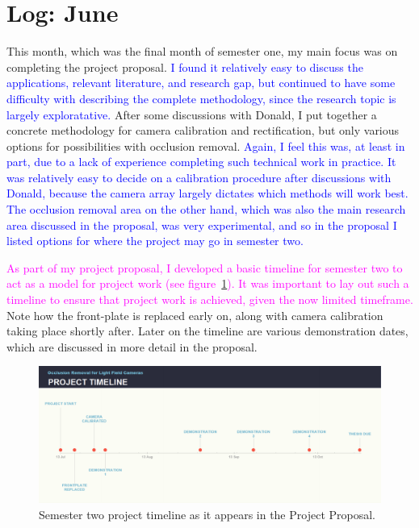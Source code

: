 \documentclass[a4paper, 12pt]{article}
\begin{document}
\section{Log: June}
This month, which was the final month of semester one, my main focus was on completing the project proposal. \textcolor{Blue}{I found it relatively easy to discuss the applications, relevant literature, and research gap, but continued to have some difficulty with describing the complete methodology, since the research topic is largely exploratative.} After some discussions with Donald, I put together a concrete methodology for camera calibration and rectification, but only various options for possibilities with occlusion removal. \textcolor{Blue}{Again, I feel this was, at least in part, due to a lack of experience completing such technical work in practice. It was relatively easy to decide on a calibration procedure after discussions with Donald, because the camera array largely dictates which methods will work best. The occlusion removal area on the other hand, which was also the main research area discussed in the proposal, was very experimental, and so in the proposal I listed options for where the project may go in semester two.}

\textcolor{Magenta}{As part of my project proposal, I developed a basic timeline for semester two to act as a model for project work (see figure~\ref{fig:timeline}). It was important to lay out such a timeline to ensure that project work is achieved, given the now limited timeframe.} Note how the front-plate is replaced early on, along with camera calibration taking place shortly after. Later on the timeline are various demonstration dates, which are discussed in more detail in the proposal.

\begin{figure}[H]
    \centering
    \includegraphics[width=\linewidth]{images/timeline}
    \caption{Semester two project timeline as it appears in the Project Proposal.}
    \label{fig:timeline}
\end{figure}
\end{document}
